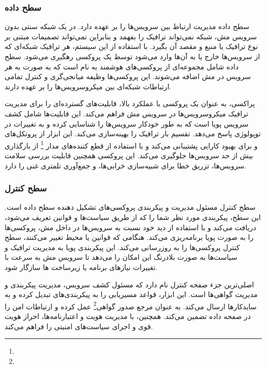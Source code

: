 \subsubsection{سطح داده}
سطح داده مدیریت ارتباط بین سرویس‌ها را بر عهده دارد. در یک شبکه سنتی بدون سرویس مش، شبکه نمی‌تواند ترافیک را بفهمد و بنابراین نمی‌تواند تصمیمات مبتنی بر نوع ترافیک یا منبع و مقصد آن بگیرد. با استفاده از این سیستم، هر ترافیک شبکه‌ای که از سرویس‌ها خارج یا به آن‌ها وارد می‌شود توسط یک پروکسی رهگیری می‌شود. سطح داده شامل مجموعه‌ای از پروکسی‌های هوشمند به نام  است که به صورت  به هر سرویس در مش اضافه می‌شوند. این پروکسی‌ها وظیفه میانجی‌گری و کنترل تمامی ارتباطات شبکه‌ای بین میکروسرویس‌ها را بر عهده دارند.

 پراکسی، به عنوان یک پروکسی با عملکرد بالا، قابلیت‌های گسترده‌ای را برای مدیریت ترافیک میکروسرویس‌ها در سرویس مش فراهم می‌کند. این قابلیت‌ها شامل کشف سرویس پویا است که به طور خودکار سرویس‌ها را شناسایی کرده و به تغییرات در توپولوژی پاسخ می‌دهد. تقسیم بار ترافیک را بهینه‌سازی می‌کند. این ابزار از پروتکل‌های  و  برای بهبود کارایی پشتیبانی می‌کند و با استفاده از قطع کننده‌های مدار \footnote{} از بارگذاری بیش از حد سرویس‌ها جلوگیری می‌کند. این پروکسی همچنین قابلیت بررسی سلامت سرویس‌ها، تزریق خطا برای شبیه‌سازی خرابی‌ها، و جمع‌آوری تلمتری غنی را دارد. 

\subsubsection{سطح کنترل}
سطح کنترل مسئول مدیریت و پیکربندی پروکسی‌های تشکیل دهنده سطح داده است. این سطح، پیکربندی مورد نظر شما را که از طریق سیاست‌ها و قوانین تعریف می‌شود، دریافت می‌کند و با استفاده از دید خود نسبت به سرویس‌ها در داخل مش، پروکسی‌ها را به صورت پویا برنامه‌ریزی می‌کند. هنگامی که قوانین یا محیط تغییر می‌کنند، سطح کنترل پروکسی‌ها را به روزرسانی می‌کند. این پیکربندی پویا به مدیریت ترافیک و سیاست‌ها به صورت بلادرنگ این امکان را می‌دهد تا سرویس مش به سرعت با تغییرات نیازهای برنامه یا زیرساخت‌ ها سازگار شود. 

اصلی‌ترین جزء صفحه کنترل  نام دارد که مسئول کشف سرویس، مدیریت پیکربندی و مدیریت گواهی‌ها است. این ابزار، قواعد مسیریابی را به پیکربندی‌های  تبدیل کرده و به سایدکارها ارسال می‌کند.  به عنوان مرجع صدور گواهی\footnote{} عمل کرده و ارتباطات امن  را در صفحه داده تضمین می‌کند. همچنین، با مدیریت هویت و اعتبارنامه‌ها، احراز هویت قوی و اجرای سیاست‌های امنیتی را فراهم می‌کند. 













